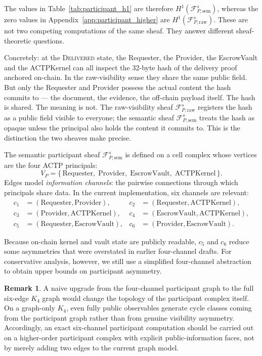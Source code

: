 \documentclass[11pt]{article}
\theoremstyle{plain}
\theoremstyle{definition}
\newtheorem{remark}[theorem]{Remark}
\newcommand{\Fsh}{\mathcal{F}}         %
\newcommand{\Hone}{H^{1}}
\newcommand{\sDELIV}{\textsc{Delivered}}
\begin{document}
The values in Table~\ref{tab:participant_h1} are therefore
$\Hone(\Fsh_{P,\mathrm{sem}}^s)$, whereas the zero values in
Appendix~\ref{app:participant_higher} are
$\Hone(\Fsh_{P,\mathrm{raw}}^s)$.  These are not two competing computations of
the same sheaf.  They answer different sheaf-theoretic questions.

Concretely: at the \sDELIV{} state, the Requester, the Provider, the
EscrowVault and the ACTPKernel can all inspect the 32-byte hash of the
delivery proof anchored on-chain.  In the raw-visibility sense they share
the same public field.  But only the Requester and Provider possess the
actual content the hash commits to --- the document, the evidence, the
off-chain payload itself.  The hash is shared.  The meaning is not.  The
raw-visibility sheaf $\Fsh_{P,\mathrm{raw}}^s$ registers the hash as a
public field visible to everyone; the semantic sheaf
$\Fsh_{P,\mathrm{sem}}^s$ treats the hash as opaque unless the principal
also holds the content it commits to.  This is the distinction the two
sheaves make precise.

\medskip

The semantic participant sheaf $\Fsh_{P,\mathrm{sem}}^s$ is defined on a cell
complex whose vertices are the four ACTP principals:
\[
  V_P = \{\,\text{Requester},\; \text{Provider},\; \text{EscrowVault},\; \text{ACTPKernel}\,\}.
\]
Edges model \emph{information channels}: the pairwise connections through
which principals share data.  In the current implementation, six channels are
relevant:
\begin{align*}
  c_1 &= (\text{Requester}, \text{Provider}), &
  c_2 &= (\text{Requester}, \text{ACTPKernel}), \\
  c_3 &= (\text{Provider},  \text{ACTPKernel}), &
  c_4 &= (\text{EscrowVault}, \text{ACTPKernel}), \\
  c_5 &= (\text{Requester}, \text{EscrowVault}), &
  c_6 &= (\text{Provider}, \text{EscrowVault}).
\end{align*}

Because on-chain kernel and vault state are publicly readable, $c_5$ and
$c_6$ reduce some asymmetries that were overstated in earlier four-channel
drafts.  For conservative analysis, however, we still use a simplified
four-channel abstraction to obtain upper bounds on participant asymmetry.

\begin{remark}
A naive upgrade from the four-channel participant graph to the full six-edge
$K_4$ graph would change the topology of the participant complex itself.  On a
graph-only $K_4$, even fully public observables generate cycle classes coming
from the participant graph rather than from genuine visibility asymmetry.
Accordingly, an exact six-channel participant computation should be carried out
on a higher-order participant complex with explicit public-information faces,
not by merely adding two edges to the current graph model.
\end{remark}
\end{document}
